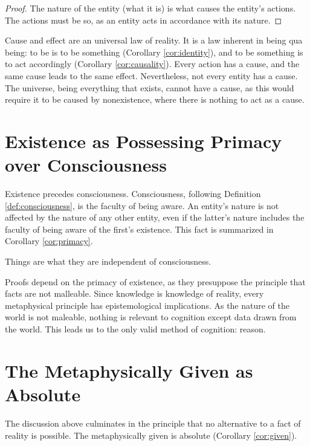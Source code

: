             \begin{proof}
                The nature of the entity (what it is) is what causes the entity's actions. The actions must be so, as an entity acts in accordance with its nature.
            \end{proof}
            
        Cause and effect are an universal law of reality. It is a law inherent in being qua being: to be is to be something (Corollary \ref{cor:identity}), and to be something is to act accordingly (Corollary \ref{cor:causality}). Every action has a cause, and the same cause leads to the same effect. Nevertheless, not every entity has a cause. The universe, being everything that exists, cannot have a cause, as this would require it to be caused by nonexistence, where there is nothing to act as a cause.
        
    \section{Existence as Possessing Primacy over Consciousness}
        
        Existence precedes consciousness. Consciousness, following Definition \ref{def:consciousness}, is the faculty of being aware. An entity's nature is not affected by the nature of any other entity, even if the latter's nature includes the faculty of being aware of the first's existence. This fact is summarized in Corollary \ref{cor:primacy}.
        
            \begin{corollary}
            \label{cor:primacy}
                Things are what they are independent of consciousness.
            \end{corollary}
        
        Proofs depend on the primacy of existence, as they presuppose the principle that facts are not malleable. Since knowledge is knowledge of reality, every metaphysical principle has epistemological implications. As the nature of the world is not maleable, nothing is relevant to cognition except data drawn from the world. This leads us to the only valid method of cognition: reason.
            
    \section{The Metaphysically Given as Absolute}
    
        The discussion above culminates in the principle that no alternative to a fact of reality is possible. The metaphysically given is absolute (Corollary \ref{cor:given}).
    
